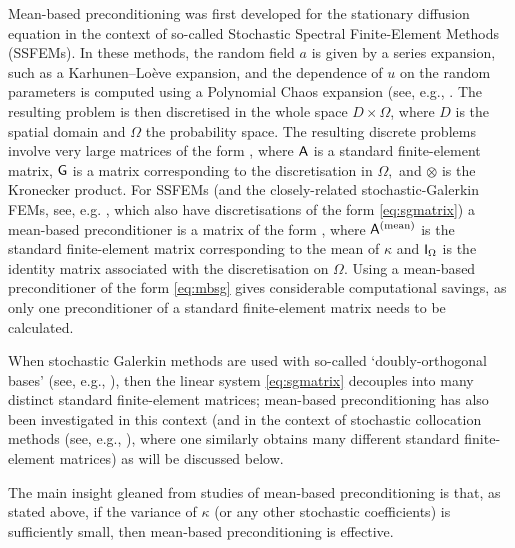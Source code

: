 Mean-based preconditioning was first developed for the stationary diffusion equation in the context of so-called Stochastic Spectral Finite-Element Methods (SSFEMs). In these methods, the random field $a$ is given by a series expansion, such as a Karhunen--Lo\`eve expansion, and the dependence of $u$ on the random parameters is computed using a Polynomial Chaos expansion (see, e.g., \cite[Section 2.4.2]{GhSp:12}. The resulting problem is then discretised in the whole space $D \times \Omega$, where $D$ is the spatial domain and $\Omega$ the probability space. The resulting discrete problems involve very large matrices of the form
\beq\label{eq:sgmatrix}
\Amat \otimes \Gmat,
\eeq
where $\mathsf{A}$ is a standard finite-element matrix, $\mathsf{G}$ is a matrix corresponding to the discretisation in $\Omega,$ and $\otimes$ is the Kronecker product. For SSFEMs (and the closely-related stochastic-Galerkin FEMs, see, e.g. \cite{BaTeZo:04}, which also have discretisations of the form \cref{eq:sgmatrix}) a mean-based preconditioner is a matrix of the form
\beq\label{eq:mbsg}
\Amatmean \otimes \ImatOmega,
\eeq
where $\mathsf{A}^{(\mathrm{mean})}$ is the standard finite-element matrix corresponding to the mean of $\kappa$ and $\mathsf{I}_{\Omega}$ is the identity matrix associated with the discretisation on $\Omega.$ Using a mean-based preconditioner of the form \cref{eq:mbsg} gives considerable computational savings, as only one preconditioner of a standard finite-element matrix needs to be calculated.

When stochastic Galerkin methods are used with so-called `doubly-orthogonal bases' (see, e.g., \cite[Section 3.2]{ErPoSiUl:09}), then the linear system \cref{eq:sgmatrix} decouples into many distinct standard finite-element matrices; mean-based preconditioning has also been investigated in this context (and in the context of stochastic collocation methods (see, e.g., \cite{BaNoTe:07}), where one similarly obtains many different standard finite-element matrices) as will be discussed below.

The main insight gleaned from studies of mean-based preconditioning is that, as stated above, if the variance of $\kappa$ (or any other stochastic coefficients) is sufficiently small, then mean-based preconditioning is effective.

